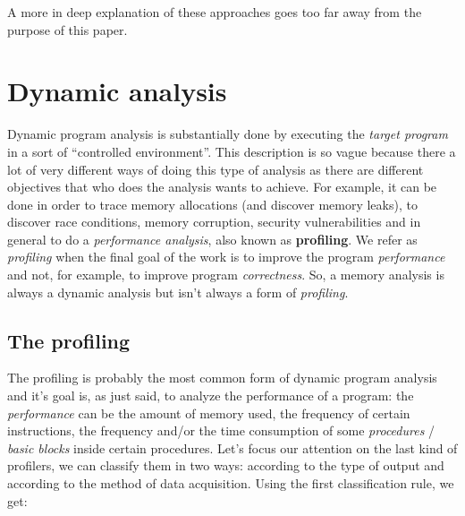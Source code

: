\documentclass[a4paper,11pt]{report}
\begin{document}
A more in deep explanation of these approaches goes too far away from the purpose of this paper.

\section{Dynamic analysis}

Dynamic program analysis is substantially done by executing the \emph{target
program} in a sort of ``controlled environment''.
This description is so vague because there a lot of very different ways of doing
this type of analysis as there are different objectives that who does the
analysis wants to achieve. For example, it can be done in order to trace memory
allocations (and discover memory leaks), to discover race conditions, memory
corruption, security vulnerabilities and in general to do a \emph{performance
analysis}, also known as \textbf{profiling}. We refer as \emph{profiling} when
the final goal of the work is to improve the program  \emph{performance} and
not, for example, to improve program \emph{correctness}. So, a memory analysis
is always a dynamic analysis but isn't always a form of \emph{profiling}.

\subsection{The profiling}
The profiling is probably the most common form of dynamic program analysis and
it's goal is, as just said, to analyze the performance of a program: the
\emph{performance} can be the amount of memory used, the frequency of certain
instructions, the frequency and/or the time consumption of some
\emph{procedures} / \emph{basic blocks} inside certain procedures. Let's focus
our attention on the last kind of profilers, we can classify them in two ways:
according to the type of output and according to the method of data acquisition.
Using the first classification rule, we get:
\end{document}
